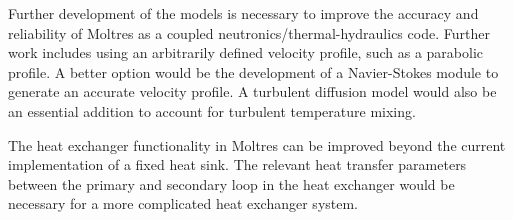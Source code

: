 \documentclass{anstrans}
\begin{document}
	Further development of the models is necessary to improve the accuracy
	and reliability of Moltres as a coupled neutronics/thermal-hydraulics code.
	Further work includes using an arbitrarily defined velocity profile, such
	as a parabolic profile. A better option would be the development of a
	Navier-Stokes module to generate an accurate velocity profile. A turbulent
	diffusion model would also be an essential addition to account for
	turbulent temperature mixing.
	
	The heat exchanger functionality in Moltres can be improved beyond
	the current implementation of a fixed heat sink. The relevant heat
	transfer parameters between the primary and secondary loop in the heat
	exchanger would be necessary for a more complicated heat exchanger system.



\begin{center}
	
	
\end{center}
\end{document}
